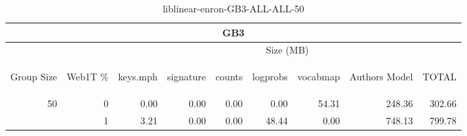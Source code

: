 \begin{center}
\begin{table}[htbp] 
 \begin{center}
\begin{tabular}{ | r | r | r | r | r | r | r | r | r |}
\hline
\multicolumn{9}{|c|}{GB3}\\
\hline
 & & \multicolumn{7}{|c|}{Size (MB)}\\ \cline{3-9}
\begin{sideways}Group Size\end{sideways} & \begin{sideways}Web1T \% \end{sideways} & \begin{sideways}keys.mph\end{sideways} & \begin{sideways}signature\end{sideways} & \begin{sideways}counts\end{sideways} & \begin{sideways}logprobs\end{sideways} & \begin{sideways}vocabmap\end{sideways} & \begin{sideways}Authors Model \end{sideways} & \begin{sideways}TOTAL\end{sideways}\\
\hline
\multirow{1}{*}{50}
 & 0 & 0.00 & 0.00 & 0.00 & 0.00 & 54.31 & 248.36 & 302.66\\ \cline{2-9}
 & 1 & 3.21 & 0.00 & 0.00 & 48.44 & 0.00 & 748.13 & 799.78\\ \cline{2-9}
\hline
\end{tabular}
\caption{liblinear-enron-GB3-ALL-ALL-50}
\label{table:liblinear-enron-GB3-ALL-ALL-50}
\end{center}
 \end{table}
\end{center}

